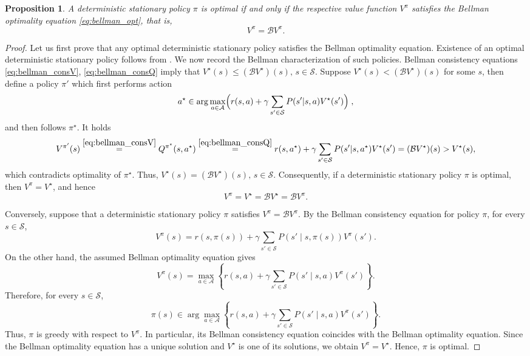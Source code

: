 \documentclass{article}
\numberwithin{equation}{section}
\newtheorem{proposition}{Proposition}
\newcommand{\cA}{\mathcal{A}}
\newcommand{\cS}{\mathcal{S}}
\newcommand{\eqsp}{\;}
\begin{document}
\begin{proposition}\label{prop:bellman_opt}
    A deterministic stationary policy $\pi$ is optimal if and only if the respective value function $V^\pi$ satisfies the Bellman optimality equation \eqref{eq:bellman_opt}, that is,
    \begin{equation*}
         V^\pi = \mathcal{B}V^\pi.
    \end{equation*}
\end{proposition}
\begin{proof}
    {Let us first prove that any optimal deterministic stationary policy satisfies the Bellman optimality equation.}
    Existence of an optimal deterministic stationary policy follows from \cite[Theorems 6.2.9 and 6.2.10]{putermanMDP}. We now record the Bellman characterization of such policies. Bellman consistency equations \eqref{eq:bellman_consV}, \eqref{eq:bellman_consQ} imply that $V^\star(s) \leq (\mathcal{B}V^\star)(s),\, s\in\cS$. Suppose $V^\star(s) < (\mathcal{B}V^\star)(s)$ for some $s$, then define a
    policy $\pi'$ which first performs action
    \begin{equation*}
        a^\star \in \arg\max_{a\in\cA} \Bigl( r(s, a) + \gamma \sum_{s'\in\cS} P(s'|s,a) V^\star(s') \Bigr)\eqsp,
    \end{equation*}
    and then follows $\pi^\star$. It holds
    \begin{equation*}
        V^{\pi'}(s) \stackrel{\eqref{eq:bellman_consV}}{=} Q^{\pi^\star}(s, a^\star) \stackrel{\eqref{eq:bellman_consQ}}{=} r(s, a^\star) + \gamma \sum_{s'\in\cS} P(s'|s, a^\star) V^{\star}(s')= (\mathcal{B}V^\star)(s) > V^\star(s),
    \end{equation*}
    which contradicts optimality of $\pi^\star$. Thus, $V^\star(s) = (\mathcal{B}V^\star)(s),\, s\in\cS$.
    {Consequently, if a deterministic stationary policy $\pi$ is optimal, then $V^\pi=V^\star$, and hence}
    \[
        {V^\pi = V^\star = \mathcal{B}V^\star = \mathcal{B}V^\pi.}
    \]

    {Conversely, suppose that a deterministic stationary policy $\pi$ satisfies \(V^\pi = \mathcal{B}V^\pi\).}
    {By the Bellman consistency equation for policy $\pi$, for every $s\in\cS$,}
    \[
        {
        V^\pi(s)
        =
        r(s,\pi(s))
        +
        \gamma \sum_{s'\in\cS}P(s'\mid s,\pi(s))V^\pi(s').
        }
    \]
    {On the other hand, the assumed Bellman optimality equation gives}
    \[
        {
        V^\pi(s)
        =
        \max_{a\in\cA}
        \left\{
        r(s,a)
        +
        \gamma \sum_{s'\in\cS}P(s'\mid s,a)V^\pi(s')
        \right\}.
        }
    \]
    {Therefore, for every $s\in\cS$,}
    \[
        {
        \pi(s)\in
        \arg\max_{a\in\cA}
        \left\{
        r(s,a)
        +
        \gamma \sum_{s'\in\cS}P(s'\mid s,a)V^\pi(s')
        \right\}.
        }
    \]
    {Thus, $\pi$ is greedy with respect to $V^\pi$. In particular, its Bellman consistency equation coincides with the Bellman optimality equation. Since the Bellman optimality equation has a unique solution and $V^\star$ is one of its solutions, we obtain $V^\pi=V^\star$. Hence, $\pi$ is optimal.}
\end{proof}
\end{document}
